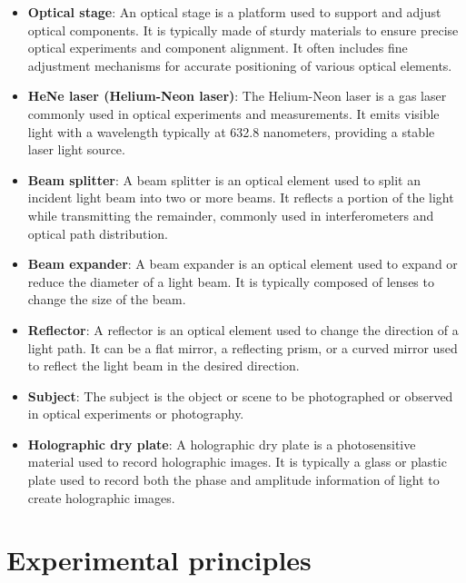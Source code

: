\documentclass[UTF8]{article}
\begin{document}
   \begin{itemize}
     \item \textbf{Optical stage}: An optical stage is a platform used to support and adjust optical components. It is typically made of sturdy materials to ensure precise optical experiments and component alignment. It often includes fine adjustment mechanisms for accurate positioning of various optical elements.
   
     \item \textbf{HeNe laser (Helium-Neon laser)}: The Helium-Neon laser is a gas laser commonly used in optical experiments and measurements. It emits visible light with a wavelength typically at 632.8 nanometers, providing a stable laser light source.
   
     \item \textbf{Beam splitter}: A beam splitter is an optical element used to split an incident light beam into two or more beams. It reflects a portion of the light while transmitting the remainder, commonly used in interferometers and optical path distribution.
   
     \item \textbf{Beam expander}: A beam expander is an optical element used to expand or reduce the diameter of a light beam. It is typically composed of lenses to change the size of the beam.
   
     \item \textbf{Reflector}: A reflector is an optical element used to change the direction of a light path. It can be a flat mirror, a reflecting prism, or a curved mirror used to reflect the light beam in the desired direction.
   
     \item \textbf{Subject}: The subject is the object or scene to be photographed or observed in optical experiments or photography.
   
     \item \textbf{Holographic dry plate}: A holographic dry plate is a photosensitive material used to record holographic images. It is typically a glass or plastic plate used to record both the phase and amplitude information of light to create holographic images.
   \end{itemize}
   
    
        
	\section{Experimental principles}  
	
\end{document}
